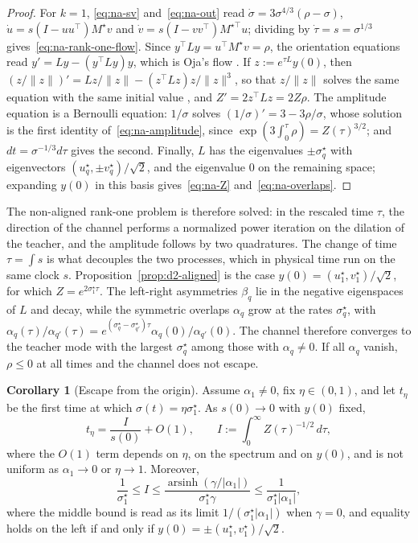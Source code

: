 \documentclass[11pt]{article}
\newcommand{\norm}[1]{\lVert #1\rVert}
\theoremstyle{definition}
\newtheorem{corollary}[theorem]{Corollary}
\numberwithin{equation}{section}
\begin{document}
\begin{proof}
For $k=1$, \eqref{eq:na-sv} and~\eqref{eq:na-out} read $\dot\sigma=3\sigma^{4/3}(\rho-\sigma)$, $\dot u=s(I-uu^\top)M^\star v$ and $\dot v=s(I-vv^\top)M^{\star\top}u$; dividing by $\dot\tau=s=\sigma^{1/3}$ gives~\eqref{eq:na-rank-one-flow}. Since $y^\top Ly=u^\top M^\star v=\rho$, the orientation equations read $y'=Ly-(y^\top Ly)y$, which is Oja's flow \citep{oja1982simplified}. If $z:=e^{\tau L}y(0)$, then $(z/\norm z)'=Lz/\norm z-(z^\top Lz)z/\norm z^3$, so that $z/\norm z$ solves the same equation with the same initial value \citep[cf.][]{yan1994global}, and $Z'=2z^\top Lz=2Z\rho$. The amplitude equation is a Bernoulli equation: $1/\sigma$ solves $(1/\sigma)'=3-3\rho/\sigma$, whose solution is the first identity of~\eqref{eq:na-amplitude}, since $\exp(3\int_0^\tau\rho)=Z(\tau)^{3/2}$; and $dt=\sigma^{-1/3}d\tau$ gives the second. Finally, $L$ has the eigenvalues $\pm\sigma^\star_q$ with eigenvectors $(u^\star_q,\pm v^\star_q)/\sqrt2$, and the eigenvalue $0$ on the remaining space; expanding $y(0)$ in this basis gives~\eqref{eq:na-Z} and~\eqref{eq:na-overlaps}.
\end{proof}

The non-aligned rank-one problem is therefore solved: in the rescaled time $\tau$, the direction of the channel performs a normalized power iteration on the dilation of the teacher, and the amplitude follows by two quadratures. The change of time $\tau=\int s$ is what decouples the two processes, which in physical time run on the same clock $s$. Proposition~\ref{prop:d2-aligned} is the case $y(0)=(u^\star_1,v^\star_1)/\sqrt2$, for which $Z=e^{2\sigma^\star_1\tau}$. The left-right asymmetries $\beta_q$ lie in the negative eigenspaces of $L$ and decay, while the symmetric overlaps $\alpha_q$ grow at the rates $\sigma^\star_q$, with $\alpha_q(\tau)/\alpha_{q'}(\tau)=e^{(\sigma^\star_q-\sigma^\star_{q'})\tau}\alpha_q(0)/\alpha_{q'}(0)$. The channel therefore converges to the teacher mode with the largest $\sigma^\star_q$ among those with $\alpha_q\neq0$. If all $\alpha_q$ vanish, $\rho\le0$ at all times and the channel does not escape.

\begin{corollary}[Escape from the origin]\label{cor:na-escape}
Assume $\alpha_1\neq0$, fix $\eta\in(0,1)$, and let $t_\eta$ be the first time at which $\sigma(t)=\eta\sigma^\star_1$. As $s(0)\to0$ with $y(0)$ fixed,
\begin{equation}\label{eq:na-escape}
t_\eta=\frac{I}{s(0)}+O(1),\qquad I:=\int_0^\infty Z(\tau)^{-1/2}\,d\tau,
\end{equation}
where the $O(1)$ term depends on $\eta$, on the spectrum and on $y(0)$, and is not uniform as $\alpha_1\to0$ or $\eta\to1$. Moreover,
\begin{equation}\label{eq:na-escape-bounds}
\frac1{\sigma^\star_1}\le I\le\frac{\operatorname{arsinh}(\gamma/|\alpha_1|)}{\sigma^\star_1\gamma}\le\frac1{\sigma^\star_1|\alpha_1|},
\end{equation}
where the middle bound is read as its limit $1/(\sigma^\star_1|\alpha_1|)$ when $\gamma=0$, and equality holds on the left if and only if $y(0)=\pm(u^\star_1,v^\star_1)/\sqrt2$.
\end{corollary}
\end{document}
